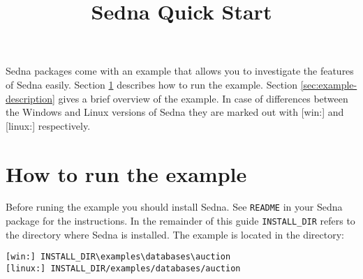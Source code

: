 \documentclass[a4paper,12pt]{article}
\title{Sedna Quick Start}
\date{}
\begin{document}
\sloppy

\maketitle

Sedna packages come with an example that allows you to investigate the features of Sedna easily. 
Section \ref{sec:how-to-run} describes how to run the example. Section \ref{sec:example-description} gives a brief overview of the example. In case of differences between the Windows and Linux versions of Sedna they are marked out with [win:] and [linux:] respectively.

\section{How to run the example}
\label{sec:how-to-run}
Before runing the example you should install Sedna. See \verb!README! in your Sedna package for the instructions.
In the remainder of this guide \verb!INSTALL_DIR! refers to the directory where Sedna is installed.  
The example is located in the directory:

\begin{verbatim}
[win:] INSTALL_DIR\examples\databases\auction
[linux:] INSTALL_DIR/examples/databases/auction
\end{verbatim}
\end{document}
